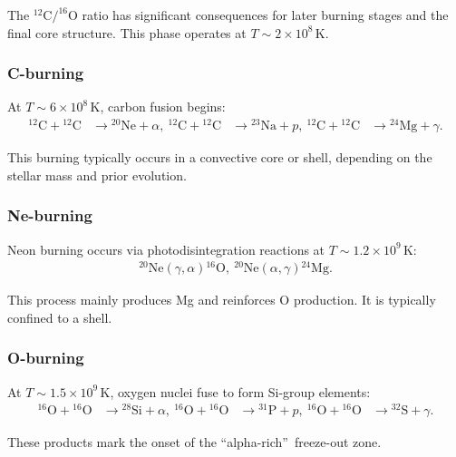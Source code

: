 The $^{12}\mathrm{C}/^{16}\mathrm{O}$ ratio has significant consequences for later burning stages and the final core structure. This phase operates at $T \sim 2\times10^8\,\mathrm{K}$.

\subsubsection{C-burning}

At $T \sim 6\times10^8\,\mathrm{K}$, carbon fusion begins:
\begin{align}
{}^{12}\mathrm{C} + {}^{12}\mathrm{C} &\rightarrow {}^{20}\mathrm{Ne} + \alpha, \
{}^{12}\mathrm{C} + {}^{12}\mathrm{C} &\rightarrow {}^{23}\mathrm{Na} + p, \
{}^{12}\mathrm{C} + {}^{12}\mathrm{C} &\rightarrow {}^{24}\mathrm{Mg} + \gamma.
\end{align}

This burning typically occurs in a convective core or shell, depending on the stellar mass and prior evolution.

\subsubsection{Ne-burning}

Neon burning occurs via photodisintegration reactions at $T \sim 1.2\times10^9\,\mathrm{K}$:
\begin{align}
{}^{20}\mathrm{Ne}(\gamma,\alpha){}^{16}\mathrm{O}, \
{}^{20}\mathrm{Ne}(\alpha,\gamma){}^{24}\mathrm{Mg}.
\end{align}

This process mainly produces Mg and reinforces O production. It is typically confined to a shell.

\subsubsection{O-burning}

At $T \sim 1.5\times10^9\,\mathrm{K}$, oxygen nuclei fuse to form Si-group elements:
\begin{align}
{}^{16}\mathrm{O} + {}^{16}\mathrm{O} &\rightarrow {}^{28}\mathrm{Si} + \alpha, \
{}^{16}\mathrm{O} + {}^{16}\mathrm{O} &\rightarrow {}^{31}\mathrm{P} + p, \
{}^{16}\mathrm{O} + {}^{16}\mathrm{O} &\rightarrow {}^{32}\mathrm{S} + \gamma.
\end{align}

These products mark the onset of the \textquotedblleft alpha-rich\textquotedblright\ freeze-out zone.

